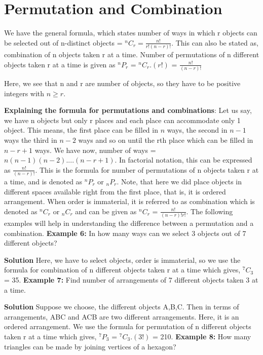 \documentclass[12pt, a4paper]{article}
\begin{document}
\section {Permutation and Combination}
\begin{tcolorbox}[colback=TealBlue!10!White,colframe=TealBlue!50!black]
We have the general formula, which states number of ways in which r objects can be selected out of n-distinct objects = $^{n}C_{r} = \frac{n!}{r!(n-r)!}$. This can also be stated as, combination of n objects taken r at a time. \newline
Number of permutations of n different objects taken r at a time is given as $^nP_r$ = $^{n}C_{r}.(r!)$ = $\frac{n!}{(n-r)!}$
\end{tcolorbox} 
Here, we see that n and r are number of objects, so they have to be positive integers with $n \geq r$. \newline \vspace{1mm}

\textbf{Explaining the formula for permutations and combinations}:
Let us say, we have n objects but only r places and each place can accommodate only 1 object. This means, the first place can be filled in $n$ ways, the second in $n-1$ ways the third in $n-2$ ways and so on until the rth place which can be filled in $n-r+1$ ways. We have now, number of ways = $n(n-1)(n-2)....(n-r+1)$. In factorial notation, this can be expressed as $\frac{n!}{(n-r)!}$. This is the formula for number of permutations of n objects taken r at a time, and is denoted as $^nP_r$ or $_nP_r$. Note, that here we did place objects in different spaces available right from the first place, that is, it is ordered arrangement. When order is immaterial, it is referred to as combination which is denoted as $^nC_r$ or $_nC_r$ and can be given as $^nC_r$ = $\frac{n!}{(n-r)! r!}$. \newline The following examples will help in understanding the difference between a permutation and a combination.\newline
\textbf{Example 6:} In how many ways can we select 3 objects out of 7 different objects?

\textbf{Solution} Here, we have to select objects, order is immaterial, so we use the formula for combination of n different objects taken r at a time which gives, $^7C_3$ = 35.\newline
\textbf{Example 7:} Find number of arrangements of 7 different objects taken 3 at a time.

\textbf{Solution} Suppose we choose, the different objects A,B,C. Then in terms of arrangements, ABC and ACB are two different arrangements. Here, it is an ordered arrangement. We use the formula for permutation of n different objects taken r at a time which gives, $^7P_3$ = $^7C_3.(3!)$ = 210.\newline
\textbf{Example 8:} How many triangles can be made by joining vertices of a hexagon?
\end{document}
